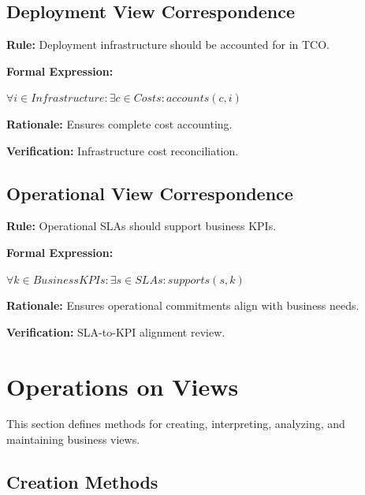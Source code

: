 \documentclass[11pt,letterpaper]{article}
\begin{document}
\subsection{Deployment View Correspondence}

\begin{definitionbox}
\textbf{Rule:} Deployment infrastructure should be accounted for in TCO.

\textbf{Formal Expression:}
\begin{center}
$\forall i \in Infrastructure : \exists c \in Costs : accounts(c, i)$
\end{center}

\textbf{Rationale:} Ensures complete cost accounting.

\textbf{Verification:} Infrastructure cost reconciliation.
\end{definitionbox}

\subsection{Operational View Correspondence}

\begin{definitionbox}
\textbf{Rule:} Operational SLAs should support business KPIs.

\textbf{Formal Expression:}
\begin{center}
$\forall k \in BusinessKPIs : \exists s \in SLAs : supports(s, k)$
\end{center}

\textbf{Rationale:} Ensures operational commitments align with business needs.

\textbf{Verification:} SLA-to-KPI alignment review.
\end{definitionbox}

\section{Operations on Views}

This section defines methods for creating, interpreting, analyzing, and maintaining business views.

\subsection{Creation Methods}
\end{document}
